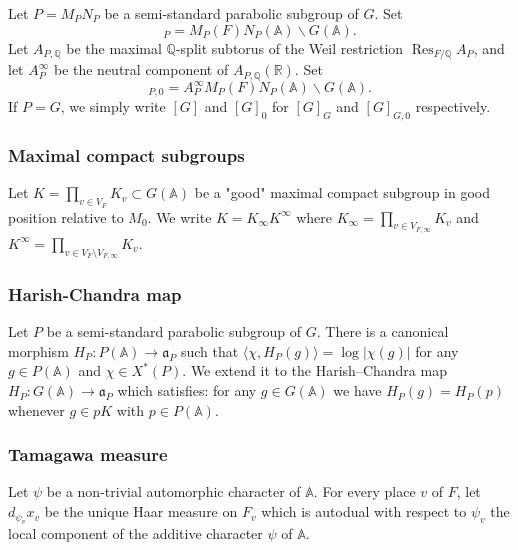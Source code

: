 \documentclass[letterpaper,11pt]{amsart}
\newcommand{\fa}{\mathfrak{a}}
\newcommand{\bA}{\mathbb{A}}
\newcommand{\Q}{\mathbb{Q}}
\newcommand{\R}{\mathbb{R}}
\newcommand{\<}{\negthickspace}
\newcommand{\valP}[1]{\left|#1\right|}
\DeclareMathOperator{\Res}{Res}
\theoremstyle{definition}
\theoremstyle{plain}
\theoremstyle{remark}
\numberwithin{equation}{section}
\begin{document}
Let $P=M_P N_P$ be a semi-standard parabolic subgroup of $G$. Set 
\begin{equation*}
    [G]_{P}=M_P(F) N_P(\bA) \backslash G(\bA).
\end{equation*}
Let $A_{P,\Q}$ be the maximal $\Q$-split subtorus of the Weil restriction $\Res_{F/\Q}A_P$, and let $A_P^\infty$ be the neutral component of $A_{P,\Q}(\R)$. Set 
\begin{equation*}
    [G]_{P,0}=A_P^\infty M_P(F) N_P(\bA) \backslash G(\bA).
\end{equation*}
If $P=G$, we simply write $[G]$ and $[G]_0$ for $[G]_G$ and $[G]_{G,0}$ respectively.
\subsubsection{Maximal compact subgroups} \label{subsubsec:max_compact_prelim}Let $K=\prod_{v \in V_F} K_v \subset G(\bA)$ be a "good" maximal compact subgroup in good position relative to $M_0$. We write $K=K_\infty K^\infty$ where $K_\infty=\prod_{v \in V_{F,\infty}} K_v$ and $K^\infty=\prod_{v \in V_F \setminus V_{F,\infty}} K_v$.

\subsubsection{Harish-Chandra map} Let $P$ be a semi-standard parabolic subgroup of $G$. There is a canonical morphism $ H_P : P(\bA) \to \fa_P$ such that $\langle \chi, H_P(g) \rangle=\log \valP{\chi(g)}$ for any $g \in P(\bA)$ and $\chi \in X^*(P)$. We extend it to the Harish--Chandra map $H_P : G(\bA) \to \fa_P$ which satisfies: for any $g \in G(\bA)$ we have $H_P(g)=H_P(p)$ whenever $g \in pK$ with $p \in P(\bA)$.

\subsubsection{Tamagawa measure}
\label{subsec:tamagawa_measure_new}

Let $\psi$ be a non-trivial automorphic character of $\bA$. For every place $v$ of $F$, let $d_{\psi_v} x_v$ be the unique Haar measure on $F_v$ which is autodual with respect to $\psi_v$ the local component of the additive character $\psi$ of $\bA$.
\end{document}
